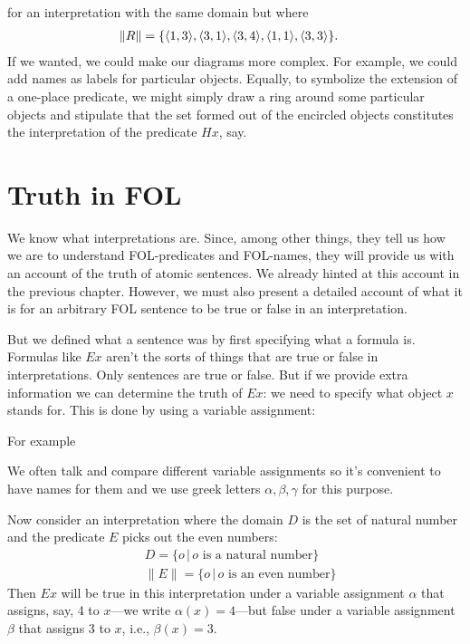 \begin{center}
\end{center}
for an interpretation with the same domain but where
	\begin{align*}\|R\|&=\{
		\mathopen{\langle}1, 3\mathclose{\rangle},
		\mathopen{\langle}3, 1\mathclose{\rangle},
		\mathopen{\langle}3, 4\mathclose{\rangle},
		\mathopen{\langle}1, 1\mathclose{\rangle},
		\mathopen{\langle}3, 3\mathclose{\rangle}\}.
	\end{align*}
If we wanted, we could make our diagrams more complex. For example, we could add names as labels for particular objects. Equally, to symbolize the extension of a one-place predicate, we might simply draw a ring around some particular objects and stipulate that the set formed out of the encircled objects constitutes the interpretation of the predicate $Hx$, say.


\chapter{Truth in FOL}\label{s:TruthFOL}
We know what interpretations are. Since, among other things, they tell us how we are to understand FOL-predicates and FOL-names, they will provide us with an account of the truth of atomic sentences. We already hinted at this account in the previous chapter. However, we must also present a detailed account of what it is for an arbitrary FOL sentence to be true or false in an interpretation.

But we defined what a sentence was by first specifying what a formula is. Formulas like $Ex$ aren't the sorts of things that are true or false in interpretations. Only sentences are true or false. But if we provide extra information we can determine the truth of $Ex$: we need to specify what object $x$ stands for. This is done by using a variable assignment: 

For example


We often talk and compare different variable assignments so it's convenient to have names for them and we use greek letters $\alpha, \beta,\gamma$ for this purpose. 

Now consider an interpretation where the domain $D$ is the set of natural number and the predicate $E$ picks out the even numbers:
\begin{align*}&D=\{o\,|\, o\text{ is a natural number}\}\\
&\|E\|=\{o\,|\,o\text{ is an even number}\}\end{align*}
Then $Ex$ will be true in this interpretation under a variable assignment $\alpha$ that assigns, say, 4 to $x$---we write $\alpha(x)=4$---but false under a variable assignment $\beta$ that assigns 3 to $x$, i.e., $\beta(x)=3$.

